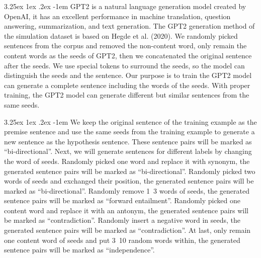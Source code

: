 \documentclass[12pt]{article}
\makeatletter
\renewcommand\paragraph{\@startsection{paragraph}{5}{\z@}%
  {3.25ex \@plus1ex \@minus.2ex}%
  {-1em}%
  {\normalfont\normalsize\bfseries}}
\makeatother
\begin{document}
\begin{CJK*}{UTF8}{bkai}
\begin{spacing}{1.77}
\paragraph{}
GPT2\cite{radford2019language} is a natural language generation model created by OpenAI, it has an excellent performance in machine translation, question answering, summarization, and text generation. The GPT2 generation method of the simulation dataset is based on Hegde et al. (2020)\cite{hegde2020unsupervised}. We randomly picked sentences from the corpus and removed the non-content word, only remain the content words as the seeds of GPT2, then we concatenated the original sentence after the seeds. We use special tokens to surround the seeds, so the model can distinguish the seeds and the sentence. Our purpose is to train the GPT2 model can generate a complete sentence including the words of the seeds. With proper training, the GPT2 model can generate different but similar sentences from the same seeds.

\paragraph{}
We keep the original sentence of the training example as the premise sentence and use the same seeds from the training example to generate a new sentence as the hypothesis sentence. These sentence pairs will be marked as ``bi-directional''. Next, we will generate sentences for different labels by changing the word of seeds. Randomly picked one word and replace it with synonym, the generated sentence pairs will be marked as ``bi-directional''. Randomly picked two words of seeds and exchanged their position, the generated sentence pairs will be marked as ``bi-directional''. Randomly remove 1~3 words of seeds, the generated sentence pairs will be marked as ``forward entailment''. Randomly picked one content word and replace it with an antonym, the generated sentence pairs will be marked as ``contradiction''. Randomly insert a negative word in seeds, the generated sentence pairs will be marked as ``contradiction''. At last, only remain one content word of seeds and put 3~10 random words within, the generated sentence pairs will be marked as ``independence''.


\end{spacing}
\end{CJK*}
\end{document}
